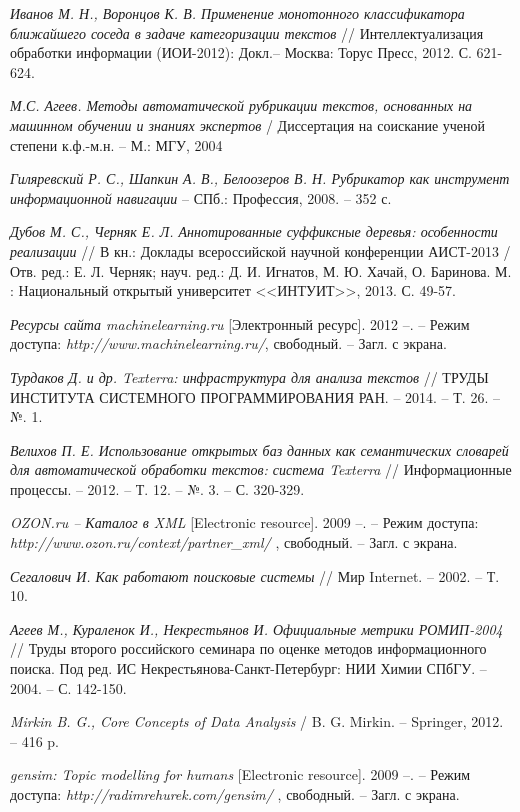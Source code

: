 \documentclass[12pt]{report}
\begin{document}
\begin{thebibliography}{99}
{\it  Иванов М. Н., Воронцов К. В. Применение монотонного классификатора ближайшего соседа в задаче категоризации текстов} // Интеллектуализация обработки информации (ИОИ-2012): Докл.-- Москва: Торус Пресс, 2012. С. 621-624. 

{\it М.С. Агеев. Методы автоматической рубрикации текстов, основанных на машинном обучении и знаниях экспертов} / Диссертация на соискание ученой степени к.ф.-м.н. -- М.: МГУ, 2004 

{\it Гиляревский Р. С., Шапкин А. В., Белоозеров В. Н. Рубрикатор как инструмент
информационной навигации} -- СПб.: Профессия, 2008. -- 352 с.

{\it Дубов М. С., Черняк Е. Л. Аннотированные суффиксные деревья: особенности реализации} // В кн.: Доклады всероссийской научной конференции АИСТ-2013 / Отв. ред.: Е. Л. Черняк; науч. ред.: Д. И. Игнатов, М. Ю. Хачай, О. Баринова. М. : Национальный открытый университет <<ИНТУИТ>>, 2013. С. 49-57.


{\it  Ресурсы сайта machinelearning.ru } [Электронный ресурс]. 2012 --. -- Режим доступа: {\it
  http://www.machinelearning.ru/}, свободный. -- Загл. с экрана.

{\it Турдаков Д. и др. Texterra: инфраструктура для анализа текстов } // ТРУДЫ ИНСТИТУТА СИСТЕМНОГО ПРОГРАММИРОВАНИЯ РАН. -- 2014. -- Т. 26. -- №. 1.

{\it Велихов П. Е. Использование открытых баз данных как семантических словарей для автоматической обработки текстов: система Texterra} // Информационные процессы. – 2012. – Т. 12. – №. 3. – С. 320-329.

{\it OZON.ru -- Каталог в XML } [Electronic resource]. 2009 --. -- Режим доступа: {\it
   http://www.ozon.ru/context/partner\_xml/ }, свободный. -- Загл. с экрана.

{\it  Сегалович И. Как работают поисковые системы} // Мир Internet. -- 2002. -- Т. 10.  

{\it Агеев М., Кураленок И., Некрестьянов И. Официальные метрики РОМИП-2004 } // Труды второго российского семинара по оценке методов информационного поиска. Под ред. ИС Некрестьянова-Санкт-Петербург: НИИ Химии СПбГУ. -- 2004. -- С. 142-150.

{\it Mirkin B. G., Core Concepts of Data Analysis} / B. G. Mirkin. -- Springer, 2012. -- 416 p.
 
{\it  gensim: Topic modelling for humans } [Electronic resource]. 2009 --. -- Режим доступа: {\it
  http://radimrehurek.com/gensim/ }, свободный. -- Загл. с экрана.


\end{thebibliography}
\end{document}
